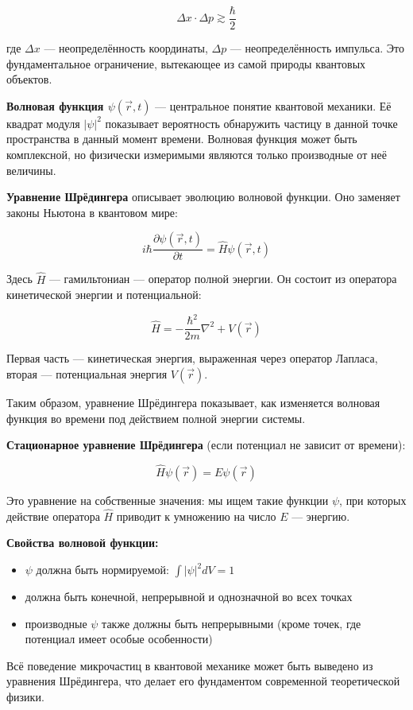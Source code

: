 \documentclass[12pt]{article}
\begin{document}
\[
\Delta x \cdot \Delta p \gtrsim \frac{\hbar}{2}
\]

где $\Delta x$ — неопределённость координаты, $\Delta p$ — неопределённость импульса. Это фундаментальное ограничение, вытекающее из самой природы квантовых объектов.

\textbf{Волновая функция $\psi(\vec{r}, t)$} — центральное понятие квантовой механики. Её квадрат модуля $|\psi|^2$ показывает вероятность обнаружить частицу в данной точке пространства в данный момент времени. Волновая функция может быть комплексной, но физически измеримыми являются только производные от неё величины.

\textbf{Уравнение Шрёдингера} описывает эволюцию волновой функции. Оно заменяет законы Ньютона в квантовом мире:

\[
i\hbar \frac{\partial \psi(\vec{r}, t)}{\partial t} = \hat{H} \psi(\vec{r}, t)
\]

Здесь $\hat{H}$ — гамильтониан — оператор полной энергии. Он состоит из оператора кинетической энергии и потенциальной:

\[
\hat{H} = -\frac{\hbar^2}{2m} \nabla^2 + V(\vec{r})
\]

Первая часть — кинетическая энергия, выраженная через оператор Лапласа, вторая — потенциальная энергия $V(\vec{r})$.

Таким образом, уравнение Шрёдингера показывает, как изменяется волновая функция во времени под действием полной энергии системы.

\textbf{Стационарное уравнение Шрёдингера} (если потенциал не зависит от времени):

\[
\hat{H} \psi(\vec{r}) = E \psi(\vec{r})
\]

Это уравнение на собственные значения: мы ищем такие функции $\psi$, при которых действие оператора $\hat{H}$ приводит к умножению на число $E$ — энергию.

\textbf{Свойства волновой функции:}
\begin{itemize}
    \item $\psi$ должна быть нормируемой: $\int |\psi|^2 dV = 1$
    \item должна быть конечной, непрерывной и однозначной во всех точках
    \item производные $\psi$ также должны быть непрерывными (кроме точек, где потенциал имеет особые особенности)
\end{itemize}

Всё поведение микрочастиц в квантовой механике может быть выведено из уравнения Шрёдингера, что делает его фундаментом современной теоретической физики.
\end{document}
